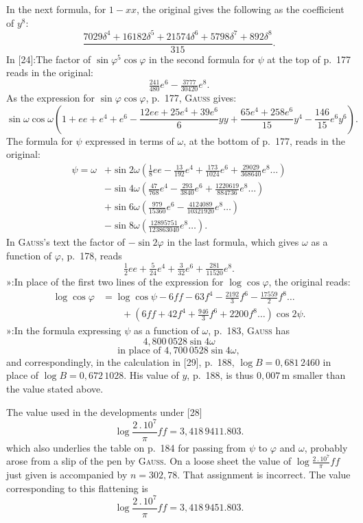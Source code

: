 {\small
\noindent In the next formula, for \(1-xx\), the original gives the following as the coefficient of \(y^8\):
\[
\frac{7029\delta^4+16182\delta^5+21574\delta^6+5798\delta^7+892\delta^8}{315}.
\]
\noindent In [24]:\quad The factor of \(\sin\varphi^5\cos\varphi\) in the second formula
for \(\psi\) at the top of p.\ 177 reads in the original:
\[
\tfrac{241}{480}e^6-\tfrac{3777}{30420}e^8.
\]
\noindent As the expression for \(\sin\varphi\cos\varphi\), p.\ 177, \textsc{Gauss} gives:
\[
\sin\omega\cos\omega\left(1+ee+e^4+e^6-\frac{12ee+25e^4+39e^6}{6}yy
+\frac{65e^4+258e^6}{15}y^4-\frac{146}{15}e^6y^6\right).
\]
\noindent The formula for \(\psi\) expressed in terms of \(\omega\), at the bottom of p.\ 177, reads in the original:
\[
\begin{aligned}
\psi=\omega&+\sin2\omega\left(\frac18ee-\frac{13}{192}e^4+\frac{173}{1024}e^6
+\frac{29029}{368640}e^8\ldots\right)\\
&-\sin4\omega\left(\frac{47}{768}e^4-\frac{293}{3840}e^6+\frac{1220619}{884736}e^8\ldots\right)\\
&+\sin6\omega\left(\frac{979}{15360}e^6-\frac{4124089}{10321920}e^8\ldots\right)\\
&-\sin8\omega\left(\frac{12895751}{123863040}e^8\ldots\right).
\end{aligned}
\]
\noindent In \textsc{Gauss}'s text the factor of \(-\sin2\varphi\) in the last formula,
which gives \(\omega\) as a function of \(\varphi\), p.\ 178, reads
\[
\tfrac12ee+\tfrac5{24}e^4+\tfrac3{32}e^6+\tfrac{281}{11520}e^8.
\]
\noindent »\quad [26]:\quad In place of the first two lines of the expression
for \(\log\cos\varphi\), the original reads:
\[
\begin{aligned}
\log\cos\varphi&=\log\cos\psi-6ff-63f^4-\frac{2192}3f^6-\frac{17559}2f^8\ldots\\
&\qquad+\left(6ff+42f^4+\frac{946}3f^6+2200f^8\ldots\right)\cos2\psi.
\end{aligned}
\]
\noindent »\quad [28]:\quad In the formula expressing \(\psi\) as a function
of \(\omega\), p.\ 183, \textsc{Gauss} has
\[
4{,}800\,0528\sin4\omega
\]
\[
\text{in place of }4{,}700\,0528\sin4\omega,
\]
\noindent and correspondingly, in the calculation in [29], p.\ 188,
\(\log B=0{,}681\,2460\) in place of \(\log B=0{,}672\,1028\). His value of \(y\),
p.\ 188, is thus \(0{,}007\,\mathrm m\) smaller than the value stated above.

\noindent The value used in the developments under [28]
\[
\log\frac{2\,.\,10^7}{\pi}ff=3{,}418\,9411.803.
\]
\noindent which also underlies the table on p.\ 184 for passing from \(\psi\) to \(\varphi\)
and \(\omega\), probably arose from a slip of the pen by \textsc{Gauss}. On a loose
sheet the value of \(\log\frac{2\,.\,10^7}{\pi}ff\) just given is accompanied by
\(n=302{,}78\). That assignment is incorrect. The value corresponding to this
flattening is
\[
\log\frac{2\,.\,10^7}{\pi}ff=3{,}418\,9451.803.
\]
\par}

